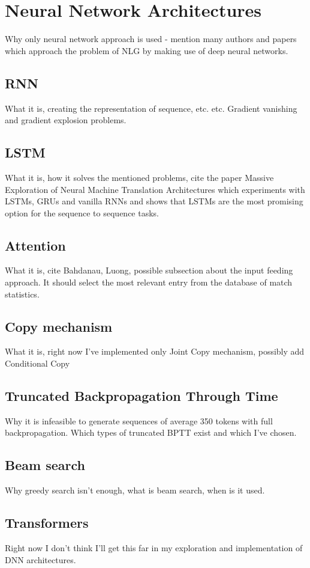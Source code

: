 \chapter{Neural Network Architectures}
Why only neural network approach is used - mention many authors and papers which approach the problem of NLG by making use of deep neural networks.

\section{RNN}
What it is, creating the representation of sequence, etc. etc. Gradient vanishing and gradient explosion problems.

\section{LSTM}
What it is, how it solves the mentioned problems, cite the paper Massive Exploration of Neural Machine Translation Architectures which experiments with LSTMs, GRUs and vanilla RNNs and shows that LSTMs are the most promising option for the sequence to sequence tasks.

\section{Attention}
What it is, cite Bahdanau, Luong, possible subsection about the input feeding approach. It should select the most relevant entry from the database of match statistics.

\section{Copy mechanism}
What it is, right now I've implemented only Joint Copy mechanism, possibly add Conditional Copy

\section{Truncated Backpropagation Through Time}
Why it is infeasible to generate sequences of average 350 tokens with full backpropagation. Which types of truncated BPTT exist and which I've chosen.

\section{Beam search}
Why greedy search isn't enough, what is beam search, when is it used.

\section{Transformers}
Right now I don't think I'll get this far in my exploration and implementation of DNN architectures.
